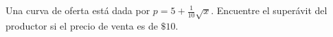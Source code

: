 \item Una curva de oferta está dada por $p = 5 + \frac{1}{10}\sqrt{x}$. Encuentre el superávit del productor si el precio de venta es de $\$10$.
